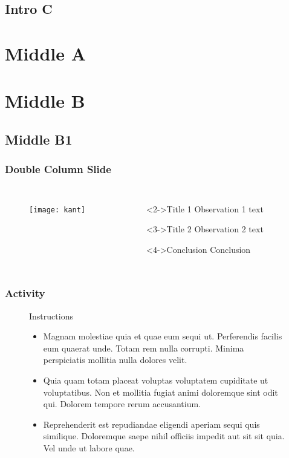 \documentclass[12pt,presentation,notes]{beamer}
\begin{document}
\subsection{Intro C}
\section{Middle A}
\section{Middle B}
\subsection{Middle B1}


\begin{frame}
\frametitle{Double Column Slide}
\begin{columns}

\begin{figure}[HT]
\texttt{[image: kant]}
\end{figure}


\begin{figure}[HT]
\begin{block}<2->{Title 1}
	Observation 1 text
\end{block}
\begin{block}<3->{Title 2}
	Observation 2 text
\end{block}
\begin{block}<4->{Conclusion}
	Conclusion
\end{block}

\end{figure}
\end{columns}
\end{frame}

\begin{frame}
\frametitle{Activity}

\begin{figure}[HT]

\begin{block}{Instructions}
\begin{itemize}[]
\item Magnam molestiae quia et quae eum sequi ut. Perferendis facilis eum quaerat unde. Totam rem nulla corrupti. Minima perspiciatis mollitia nulla dolores velit.

\item Quia quam totam placeat voluptas voluptatem cupiditate ut voluptatibus. Non et mollitia fugiat animi doloremque sint odit qui. Dolorem tempore rerum accusantium.

\item Reprehenderit est repudiandae eligendi aperiam sequi quis similique. Doloremque saepe nihil officiis impedit aut sit sit quia. Vel unde ut labore quae.
\end{itemize}
\end{block}
\end{figure}

\end{frame}
\end{document}
